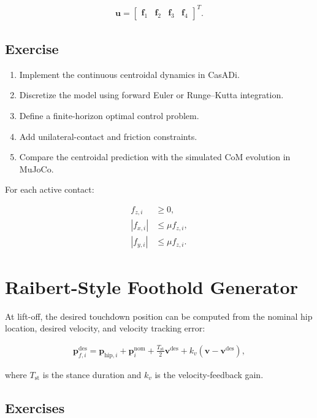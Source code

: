 \documentclass[11pt,a4paper]{article}
\begin{document}
\begin{align*}
\bm{u} =
\begin{bmatrix}
\bm{f}_1 &
\bm{f}_2 &
\bm{f}_3 &
\bm{f}_4
\end{bmatrix}^{T}.
\end{align*}

\subsection*{Exercise}

\begin{enumerate}[label=\arabic*.]
    \item Implement the continuous centroidal dynamics in CasADi.
    \item Discretize the model using forward Euler or Runge--Kutta integration.
    \item Define a finite-horizon optimal control problem.
    \item Add unilateral-contact and friction constraints.
    \item Compare the centroidal prediction with the simulated CoM evolution in MuJoCo.
\end{enumerate}

For each active contact:

\begin{align*}
f_{z,i} &\geq 0, \\
|f_{x,i}| &\leq \mu f_{z,i}, \\
|f_{y,i}| &\leq \mu f_{z,i}.
\end{align*}



\section{Raibert-Style Foothold Generator}

At lift-off, the desired touchdown position can be computed from the nominal hip location, desired velocity, and velocity tracking error:

\begin{align*}
\bm{p}_{f,i}^{\mathrm{des}} =
\bm{p}_{\mathrm{hip},i}
+
\bm{p}_{i}^{\mathrm{nom}}
+
\frac{T_{\mathrm{st}}}{2}\bm{v}^{\mathrm{des}}
+
k_v
\left(
\bm{v} - \bm{v}^{\mathrm{des}}
\right),
\end{align*}

where \(T_{\mathrm{st}}\) is the stance duration and \(k_v\) is the velocity-feedback gain.


\subsection*{Exercises}
\end{document}
